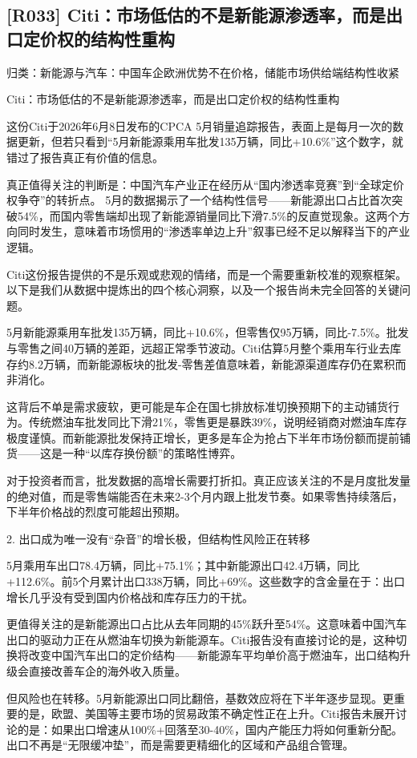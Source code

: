 \documentclass[11pt]{ctexart}
\begin{document}
\subsection{[R033] Citi：市场低估的不是新能源渗透率，而是出口定价权的结构性重构}
{\small\color{refgray}归类：新能源与汽车：中国车企欧洲优势不在价格，储能市场供给端结构性收紧}

Citi：市场低估的不是新能源渗透率，而是出口定价权的结构性重构

这份Citi于2026年6月8日发布的CPCA 5月销量追踪报告，表面上是每月一次的数据更新，但若只看到“5月新能源乘用车批发135万辆，同比+10.6\%”这个数字，就错过了报告真正有价值的信息。

真正值得关注的判断是：中国汽车产业正在经历从“国内渗透率竞赛”到“全球定价权争夺”的转折点。 5月的数据揭示了一个结构性信号——新能源出口占比首次突破54\%，而国内零售端却出现了新能源销量同比下滑7.5\%的反直觉现象。这两个方向同时发生，意味着市场惯用的“渗透率单边上升”叙事已经不足以解释当下的产业逻辑。

Citi这份报告提供的不是乐观或悲观的情绪，而是一个需要重新校准的观察框架。以下是我们从数据中提炼出的四个核心洞察，以及一个报告尚未完全回答的关键问题。

5月新能源乘用车批发135万辆，同比+10.6\%，但零售仅95万辆，同比-7.5\%。批发与零售之间40万辆的差距，远超正常季节波动。Citi估算5月整个乘用车行业去库存约8.2万辆，而新能源板块的批发-零售差值意味着，新能源渠道库存仍在累积而非消化。

这背后不单是需求疲软，更可能是车企在国七排放标准切换预期下的主动铺货行为。传统燃油车批发同比下滑21\%，零售更是暴跌39\%，说明经销商对燃油车库存极度谨慎。而新能源批发保持正增长，更多是车企为抢占下半年市场份额而提前铺货——这是一种“以库存换份额”的策略性博弈。

对于投资者而言，批发数据的高增长需要打折扣。真正应该关注的不是月度批发量的绝对值，而是零售端能否在未来2-3个月内跟上批发节奏。如果零售持续落后，下半年价格战的烈度可能超出预期。

2. 出口成为唯一没有“杂音”的增长极，但结构性风险正在转移

5月乘用车出口78.4万辆，同比+75.1\%；其中新能源出口42.4万辆，同比+112.6\%。前5个月累计出口338万辆，同比+69\%。这些数字的含金量在于：出口增长几乎没有受到国内价格战和库存压力的干扰。

更值得关注的是新能源出口占比从去年同期的45\%跃升至54\%。这意味着中国汽车出口的驱动力正在从燃油车切换为新能源车。Citi报告没有直接讨论的是，这种切换将改变中国汽车出口的定价结构——新能源车平均单价高于燃油车，出口结构升级会直接改善车企的海外收入质量。

但风险也在转移。5月新能源出口同比翻倍，基数效应将在下半年逐步显现。更重要的是，欧盟、美国等主要市场的贸易政策不确定性正在上升。Citi报告未展开讨论的是：如果出口增速从100\%+回落至30-40\%，国内产能压力将如何重新分配。出口不再是“无限缓冲垫”，而是需要更精细化的区域和产品组合管理。
\end{document}
